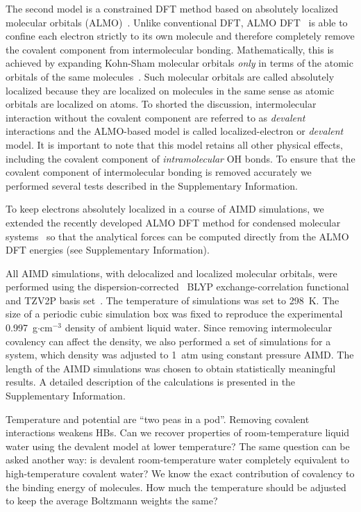 \documentclass[prl,twocolumn,showpacs]{revtex4}
\begin{document}
The second model is a constrained DFT method based on absolutely localized molecular orbitals (ALMO)~\cite{khaliullin2006efficient}. Unlike conventional DFT, ALMO DFT~\cite{Khaliullin2013JCTC} is able to confine each electron strictly to its own molecule and therefore completely remove the covalent component from intermolecular bonding. Mathematically, this is achieved by expanding Kohn-Sham molecular orbitals \emph{only} in terms of the atomic orbitals of the same molecules~\cite{gian,khaliullin2006efficient, blw}. Such molecular orbitals are called absolutely localized because they are localized on molecules in the same sense as atomic orbitals are localized on atoms. To shorted the discussion, intermolecular interaction without the covalent component are referred to as \emph{devalent} interactions and the ALMO-based model is called localized-electron or \emph{devalent} model. It is important to note that this model retains all other physical effects, including the covalent component of \emph{intramolecular} OH bonds. %
To ensure that the covalent component of intermolecular bonding is removed accurately we performed several tests described in the Supplementary Information.

To keep electrons absolutely localized in a course of AIMD simulations, we extended the recently developed ALMO DFT method for  condensed molecular systems~\cite{Khaliullin2013JCTC} so that the analytical forces can be computed directly from the ALMO DFT energies (see Supplementary Information). 

All AIMD simulations, with delocalized and localized molecular orbitals, were performed using the dispersion-corrected~\cite{ZZZ} BLYP exchange-correlation functional~\cite{ZZZ} and TZV2P basis set~\cite{ZZZ}. The temperature of simulations was set to 298~K. The size of a periodic cubic simulation box was fixed to reproduce the experimental 0.997~g$\cdot$cm$^{-3}$ density of ambient liquid water. Since removing intermolecular covalency can affect the density, we also performed a set of simulations for a system, which density was adjusted to 1~atm using constant pressure AIMD. The length of the AIMD simulations was chosen to obtain statistically meaningful results. A detailed description of the calculations is presented in the Supplementary Information.

\new Temperature and potential are ``two peas in a pod''. Removing covalent interactions weakens HBs. Can we recover properties of room-temperature liquid water using the devalent model at lower temperature? The same question can be asked another way: is devalent room-temperature water completely equivalent to high-temperature covalent water? We know the exact contribution of covalency to the binding energy of molecules. How much the temperature should be adjusted to keep the average Boltzmann weights the same?\old
\end{document}

